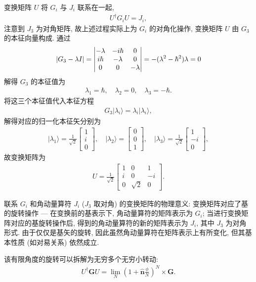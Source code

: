 \documentclass{assignment}
\begin{document}
\begin{pf}
    变换矩阵 $U$ 将 $G_i$ 与 $J_i$ 联系在一起,
    \begin{align}
        U^{\dagger}G_iU=J_i,
    \end{align}
    注意到 $J_3$ 为对角矩阵, 故上述过程实际上为 $G_i$ 的对角化操作, 变换矩阵 $U$ 由 $G_3$ 的本征向量构成. 通过
    \begin{align}
        \left\lvert G_3-\lambda I\right\rvert=\begin{vmatrix}
            -\lambda&-i\hbar&0\\
            i\hbar&-\lambda&0\\
            0&0&-\lambda
        \end{vmatrix}=-(\lambda^2-\hbar^2)\lambda=0
    \end{align}
    解得 $G_3$ 的本征值为
    \begin{align}
        \lambda_1=\hbar,\quad\lambda_2=0,\quad\lambda_3=-\hbar.
    \end{align}
    将这三个本征值代入本征方程
    \begin{align}
        G_3\lvert\lambda_i\rangle=\lambda_i\lvert\lambda_i\rangle,
    \end{align}
    解得对应的归一化本征矢分别为
    \begin{align}
        \lvert\lambda_1\rangle=\frac{1}{\sqrt{2}}\begin{bmatrix}
            1\\
            i\\
            0
        \end{bmatrix},\quad\lvert\lambda_2\rangle=\begin{bmatrix}
            0\\
            0\\
            1
        \end{bmatrix},\quad\lvert\lambda_3\rangle=\frac{1}{\sqrt{2}}\begin{bmatrix}
            1\\
            -i\\
            0
        \end{bmatrix},
    \end{align}
    故变换矩阵为
    \begin{align}
        U=\frac{1}{\sqrt{2}}\begin{bmatrix}
            1&0&1\\
            i&0&-i\\
            0&\sqrt{2}&0
        \end{bmatrix}.
    \end{align}

    联系 $G_i$ 和角动量算符 $J_i$ ($J_3$ 取对角) 的变换矩阵的物理意义: 变换矩阵对应了基的旋转操作 --- 在变换前的基表示下, 角动量算符的矩阵表示为 $G_i$; 当进行变换矩阵对应的基旋转操作后, 得到的角动量算符的新的矩阵表示为 $J_i$, 其中 $J_3$ 为对角形式. 由于仅仅是基矢的旋转, 因此虽然角动量算符在矩阵表示上有所变化, 但其基本性质 (如对易关系) 依然成立.

    该有限角度的旋转可以拆解为无穷多个无穷小转动:
    \begin{align}
        U^{\dagger}\bm{G}U=\lim_N(1+\hat{\bm{n}}\frac{\phi}{N})^N\times\bm{G}.
    \end{align}
\end{pf}
\end{document}
